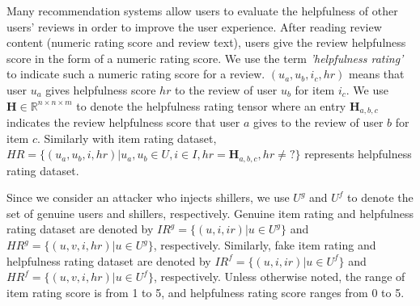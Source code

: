 \documentclass[master,english,final]{kaist-ucs}
\begin{document}
Many recommendation systems allow users to evaluate the helpfulness of other users’ reviews in order to improve the user experience.
After reading review content (numeric rating score and review text), users give the review helpfulness score in the form of a numeric rating score.
We use the term \textit{'helpfulness rating'} to indicate such a numeric rating score for a review.
$(u_a,u_b,i_c,hr)$ means that user $u_a$ gives helpfulness score $hr$ to the review of user $u_b$ for item $i_c$.
We use $\bm{H} \in \mathbb{R}^{n \times n \times m}$ to denote the helpfulness rating tensor where an entry $\bm{H}_{a,b,c}$ indicates the review helpfulness score that user $a$ gives to the review of user $b$ for item $c$.
Similarly with item rating dataset, $HR=\{(u_a,u_b,i,hr)| u_a,u_b \in U,i \in I,hr=\bm{H}_{a,b,c},hr \neq ?\}$ represents helpfulness rating dataset.

Since we consider an attacker who injects shillers, we use $U^g$ and $U^f$ to denote the set of genuine users and shillers, respectively.
Genuine item rating and helpfulness rating dataset are denoted by $IR^g=\{(u,i,ir)|u \in U^g\}$ and $HR^g=\{(u,v,i,hr)|u \in U^g\}$, respectively.
Similarly, fake item rating and helpfulness rating dataset are denoted by $IR^f=\{(u,i,ir)|u \in U^f\}$ and $HR^f=\{(u,v,i,hr)|u \in U^f\}$, respectively.
Unless otherwise noted, the range of item rating score is from 1 to 5, and helpfulness rating score ranges from 0 to 5.
\end{document}
